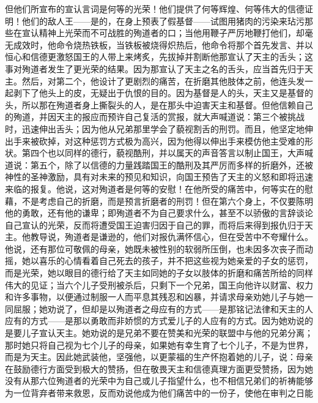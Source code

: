 但他们所宣布的宣认言词是何等的光荣！他们提供了何等辉煌、何等伟大的信德证明！他们的敌人王——是的，在身上预表了假基督——试图用猪肉的污染来玷污那些在宣认精神上光荣而不可战胜的殉道者的口；当他用鞭子严厉地鞭打他们，却毫无成效时，他命令烧热铁板，当铁板被烧得炽热后，他命令将那个首先发言、并以恒心和信德更激怒国王的人带上来烤炙，先拔掉并割断他那宣认了天主的舌头；这事对殉道者发生了更光荣的结果。因为那宣认了天主之名的舌头，应当首先归于天主。然后，对第二个，他设计了更剧烈的痛苦，在折磨其他肢体之前，他连头发一起剥下了他头上的皮，无疑出于仇恨的目的。因为基督是人的头，天主又是基督的头，所以那在殉道者身上撕裂头的人，是在那头中迫害天主和基督。但他信赖自己的殉道，并因天主的报应而预许自己复活的赏报，就大声喊道说：第三个被挑战时，迅速伸出舌头；因为他从兄弟那里学会了藐视割舌的刑罚。而且，他坚定地伸出手来被砍掉，对这种惩罚方式极为高兴，因为他得以伸出手来模仿他主受难的形状。第四个也以同样的德行，藐视酷刑，并以属天的声音答言以制止国王，大声喊道说：第五个，除了以信德的力量践踏国王的酷刑及其严厉而多样的折磨外，还被神性的圣神激励，具有对未来的预见和知识，向国王预告了天主的义怒和即将迅速来临的报复。他说，这对殉道者是何等的安慰！在他所受的痛苦中，何等实在的慰藉，不是考虑自己的折磨，而是预言折磨者的刑罚！但在第六个身上，不仅要陈明他的勇敢，还有他的谦卑；即殉道者不为自己要求什么，甚至不以骄傲的言辞谈论自己宣认的光荣，反而将遭受国王迫害归因于自己的罪，而将后来得到报仇归于天主。他教导说，殉道者是谦逊的，他们对报仇满怀信心，但在受苦中不夸耀什么。他说，还有那位可敬佩的母亲，她既未被性别的软弱所压倒，也未因多次丧子而动摇，她以喜乐的心情看着自己死去的孩子，并不把这些视为她亲爱的子女的惩罚，而是光荣，她以眼目的德行给了天主如同她的子女以肢体的折磨和痛苦所给的同样伟大的见证；当六个儿子受刑被杀后，只剩下一个兄弟，国王向他许以财富、权力和许多事物，以便通过制服一人而平息其残忍和凶暴，并请求母亲劝她儿子与她一同屈服；她劝说了，但却是以殉道者之母应有的方式——是那铭记法律和天主的人应有的方式——是那以勇敢而非娇惯的方式爱儿子的人应有的方式。因为她劝说的是要儿子宣认天主。她劝说的是兄弟不要在赞美和光荣的联盟中与他的兄弟分离；那时她只将自己视为七个儿子的母亲，如果她有幸生育了七个儿子，不是为世界，而是为天主。因此她武装他，坚强他，以更蒙福的生产怀抱着她的儿子，说：母亲在鼓励德行方面受到极大的赞扬，但在敬畏天主和信德真理方面更受赞扬，因为她没有从那六位殉道者的光荣中为自己或儿子指望什么，也不相信兄弟们的祈祷能够为一位背弃者带来救恩，反而劝说他成为他们痛苦中的一份子，使他在审判之日能